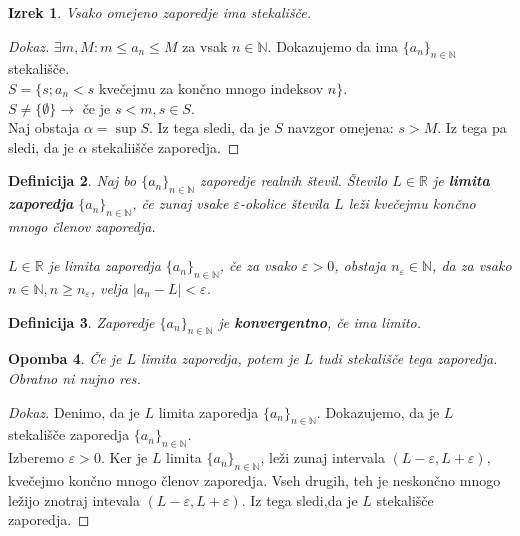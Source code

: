 \documentclass[11pt]{article}
\newtheorem{Izrek}{{\sc Izrek}}[section]
\newtheorem{Definicija}[Izrek]{{\sc Definicija}}
\newtheorem{Opomba}[Izrek]{{\sc Opomba}}
\newenvironment{dokaz}[1][{\sc Dokaz}]{\begin{proof}[#1]\renewcommand*{\qedsymbol}{\(\blacksquare\)}}{\end{proof}}
\begin{document}
\begin{Izrek}
	Vsako omejeno zaporedje ima stekališče.
\end{Izrek}


\begin{dokaz}
	
	$\exists m, M : m \le a_n \le M$ za vsak $n\in \mathbb{N}$. Dokazujemo da ima  $\{a_n\}_{n\in \mathbb{N}}$ stekališče.
	\\
	$S = \{s; a_n < s$ kvečejmu za končno mnogo indeksov $n\}$.
	\\
	$S \ne \{ \emptyset\} \to $ če je $s<m , s\in S$.
	\\
	Naj obstaja $\alpha = \sup{S}$.
	Iz tega sledi, da je $S$ navzgor omejena: $s>M$. Iz tega pa sledi, da je $\alpha$ stekaliišče zaporedja.
\end{dokaz}

\begin{Definicija}
	Naj bo $\{a_n\}_{n\in \mathbb{N}}$ zaporedje realnih števil. Število $L\in \mathbb{R}$ je\textbf{ limita zaporedja} $\{a_n\}_{n\in \mathbb{N}}$, če zunaj vsake $\varepsilon$-okolice števila $L$ leži kvečejmu končno mnogo členov zaporedja.
	\\
	\\
	$L\in \mathbb{R}$ je limita zaporedja $\{a_n\}_{n\in \mathbb{N}}$, če za vsako $\varepsilon > 0$, obstaja $n_\varepsilon \in \mathbb{N}$, da za vsako  $n\in \mathbb{N}, n \ge n_\varepsilon$, velja $|a_n - L| < \varepsilon$.
\end{Definicija}

\begin{Definicija}
	Zaporedje $\{a_n\}_{n\in \mathbb{N}}$ je \textbf{konvergentno}, če ima limito.
\end{Definicija}

\begin{Opomba}
	Če je $L$ limita zaporedja, potem je $L$ tudi stekališče tega zaporedja. Obratno ni nujno res.
\end{Opomba}

\begin{dokaz}
	Denimo, da je $L$ limita zaporedja $\{a_n\}_{n\in \mathbb{N}}$. Dokazujemo, da je $L$ stekališče zaporedja $\{a_n\}_{n\in \mathbb{N}}$.
	\\
	Izberemo $\varepsilon > 0$. Ker je $L$ limita  $\{a_n\}_{n\in \mathbb{N}}$, leži zunaj intervala $(L -\varepsilon, L + \varepsilon)$, kvečejmo končno mnogo členov zaporedja. Vseh drugih, teh je neskončno mnogo ležijo znotraj intevala $(L -\varepsilon, L + \varepsilon)$. Iz tega sledi,da je $L$ stekališče zaporedja.
	
\end{dokaz}
\end{document}
